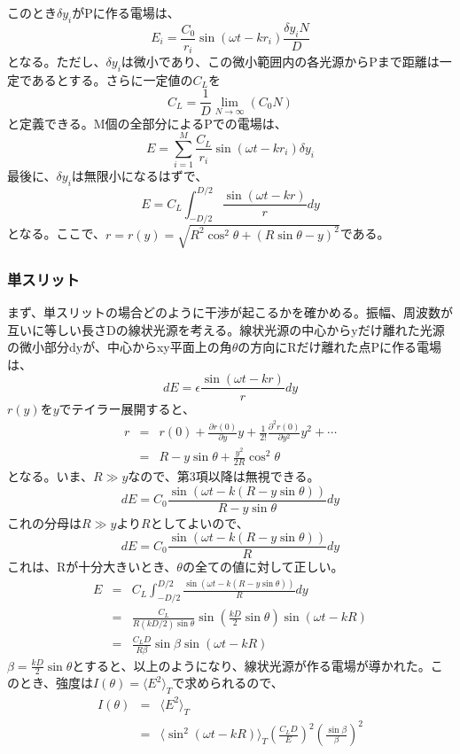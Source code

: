 \documentclass[10pt,a4j]{jarticle}
\begin{document}
\clearpage
このとき$\delta y_i$がPに作る電場は、
\[
E_i = \frac{C_0}{r_i} \sin(\omega t- k r_i ) \frac{\delta y_i N}{D}
\]
となる。ただし、$\delta y_i$は微小であり、この微小範囲内の各光源からPまで距離は一定であるとする。さらに一定値の$C_L$を
\[
C_L = \frac{1}{D}  \lim_{N \to \infty} (C_0 N)
\]
と定義できる。M個の全部分によるPでの電場は、
\[
E = \sum_{i=1}^M \frac{C_L}{r_i} \sin(\omega t - k r_i) \delta y_i
\]
最後に、$\delta y_i$は無限小になるはずで、
\[
E = C_L \int_{-D/2}^{D/2} \frac{\sin(\omega t - k r)}{r} dy
\]
となる。ここで、$r = r(y)=\sqrt{R^2 \cos^2 \theta + (R\sin \theta - y )^2}$である。


\subsubsection{単スリット}
まず、単スリットの場合どのように干渉が起こるかを確かめる。振幅、周波数が互いに等しい長さDの線状光源を考える。線状光源の中心からyだけ離れた光源の微小部分dyが、中心からxy平面上の角$\theta$の方向にRだけ離れた点Pに作る電場は、
\[
dE = \epsilon \frac{\sin(\omega t - kr)}{r} dy
\]
$r(y)$を$y$でテイラー展開すると、
\begin{eqnarray*}
r &=&r(0) + \frac{\partial r(0)}{\partial y} y + \frac{1}{2!} \frac{\partial^2 r(0)}{\partial y^2} y^2 + \cdots \\
&=&R - y\sin\theta + \frac{y^2}{2R} \cos^2 \theta
\end{eqnarray*}
となる。いま、$R \gg y$なので、第3項以降は無視できる。
\[
dE = C_0 \frac{\sin(\omega t -k(R- y\sin \theta ))}{R- y \sin\theta} dy
\]
これの分母は$R \gg y$より$R$としてよいので、
\[
dE = C_0 \frac{\sin(\omega t -k(R- y\sin \theta ))}{R} dy
\]
これは、Rが十分大きいとき、$\theta$の全ての値に対して正しい。
\begin{eqnarray*}
E &=& C_L \int_{-D/2}^{D/2} \frac{\sin(\omega t - k( R - y\sin\theta ))}{R} dy \\
&=& \frac{C_L}{R(kD/2)\sin\theta} \sin\left(\frac{kD}{2} \sin \theta \right) \sin(\omega t -kR) \\
&=& \frac{C_L D}{R\beta} \sin \beta \sin(\omega t - kR)
\end{eqnarray*}
$\beta = \frac{kD}{2} \sin\theta$とすると、以上のようになり、線状光源が作る電場が導かれた。このとき、強度は$I(\theta) = \langle E^2\rangle_T$で求められるので、
\begin{eqnarray*}
I(\theta) &=& \langle E^2 \rangle_T\\
&=& \langle \sin^2(\omega t - kR)\rangle_T \left(\frac{C_L D}{E}\right)^2 \left(\frac{\sin\beta}{\beta}\right)^2
\end{eqnarray*}
\end{document}
